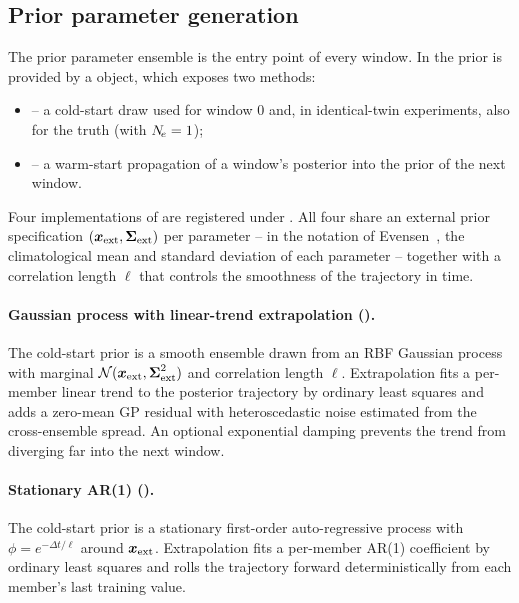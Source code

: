 \subsection{Prior parameter generation}
\label{subsec:da-prior}

The prior parameter ensemble is the entry point of every \ESMDA{}
window.  In \pyurbanair{} the prior is provided by a
\paramTSclass{} object, which exposes two methods:
\begin{itemize}
  \item {} -- a cold-start
        draw used for window $0$ and, in identical-twin experiments,
        also for the truth (with $N_{\!e} = 1$);
  \item {} --
        a warm-start propagation of a window's posterior into the
        prior of the next window.
\end{itemize}
Four implementations of \paramTSclass{} are registered under
.
All four share an
external prior specification $(\boldsymbol{x}_{\mathrm{ext}}, \boldsymbol{\Sigma}_{\mathrm{ext}})$ per parameter -- in
the notation of Evensen~\cite{evensen2024}, the climatological mean
and standard deviation of each parameter -- together with a
correlation length $\ell$ that controls the smoothness of the
trajectory in time.

\paragraph{Gaussian process with linear-trend extrapolation
().}
The cold-start prior is a smooth ensemble drawn from an RBF Gaussian
process~\cite{rasmussen2006gp} with marginal $\mathcal{N}(\boldsymbol{x}_{\mathrm{ext}},
\boldsymbol{\Sigma}_{\mathrm{ext}}^2)$ and correlation length $\ell$.  Extrapolation fits a
per-member linear trend to the posterior trajectory by ordinary
least squares and adds a zero-mean GP residual with heteroscedastic
noise estimated from the cross-ensemble spread.  An optional
exponential damping prevents the trend from diverging far into the
next window.

\paragraph{Stationary AR(1) ().}
The cold-start prior is a stationary first-order auto-regressive
process with $\phi = e^{-\Delta t / \ell}$ around $\boldsymbol{x}_{\mathrm{ext}}$.
Extrapolation fits a per-member AR(1) coefficient by ordinary least
squares and rolls the trajectory forward deterministically from each
member's last training value.

